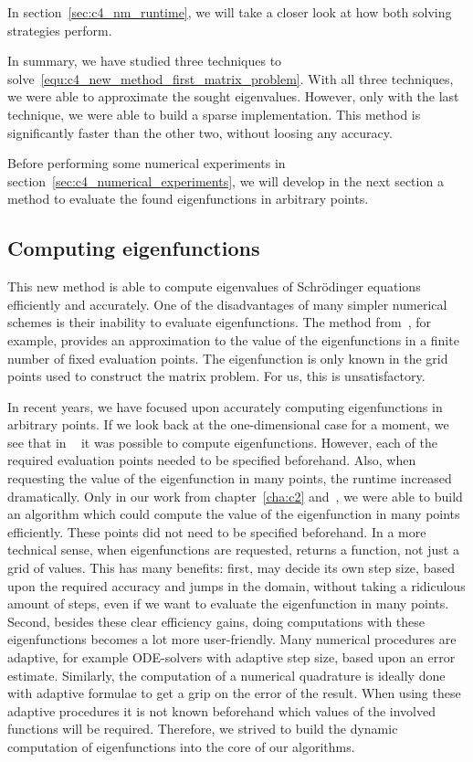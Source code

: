 In section~\ref{sec:c4_nm_runtime}, we will take a closer look at how both solving strategies perform.

In summary, we have studied three techniques to solve~\eqref{equ:c4_new_method_first_matrix_problem}. With all three techniques, we were able to approximate the sought eigenvalues. However, only with the last technique, we were able to build a sparse implementation. This method is significantly faster than the other two, without loosing any accuracy.

Before performing some numerical experiments in section~\ref{sec:c4_numerical_experiments}, we will develop in the next section a method to evaluate the found eigenfunctions in arbitrary points.

\subsection{Computing eigenfunctions}

This new method is able to compute eigenvalues of Schrödinger equations efficiently and accurately. One of the disadvantages of many simpler numerical schemes is their inability to evaluate eigenfunctions. The method from~\cite{wang_new_2009}, for example, provides an approximation to the value of the eigenfunctions in a finite number of fixed evaluation points. The eigenfunction is only known in the grid points used to construct the matrix problem. For us, this is unsatisfactory.

In recent years, we have focused upon accurately computing eigenfunctions in arbitrary points. If we look back at the one-dimensional case for a moment, we see that in ~\cite{ledoux_matslise_2016} it was possible to compute eigenfunctions. However, each of the required evaluation points needed to be specified beforehand. Also, when requesting the value of the eigenfunction in many points, the runtime increased dramatically. Only in our work from chapter~\ref{cha:c2} and~\cite{baeyens_fast_2020}, we were able to build an algorithm which could compute the value of the eigenfunction in many points efficiently. These points did not need to be specified beforehand. In a more technical sense, when eigenfunctions are requested,  returns a function, not just a grid of values. This has many benefits: first,  may decide its own step size, based upon the required accuracy and jumps in the domain, without taking a ridiculous amount of steps, even if we want to evaluate the eigenfunction in many points. Second, besides these clear efficiency gains, doing computations with these eigenfunctions becomes a lot more user-friendly. Many numerical procedures are adaptive, for example ODE-solvers with adaptive step size, based upon an error estimate. Similarly, the computation of a numerical quadrature is ideally done with adaptive formulae to get a grip on the error of the result. When using these adaptive procedures it is not known beforehand which values of the involved functions will be required. Therefore, we strived to build the dynamic computation of eigenfunctions into the core of our algorithms.

